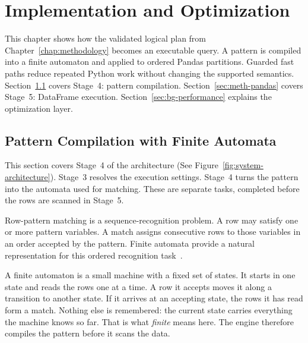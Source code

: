 \providecommand{\mr}{\texttt{MATCH\_RECOGNIZE}}
\chapter{Implementation and Optimization}
\label{chap:implementation}

This chapter shows how the validated logical plan from
Chapter~\ref{chap:methodology} becomes an executable query.  A pattern
is compiled into a finite automaton and applied to ordered
Pandas partitions.  Guarded fast paths reduce repeated Python
work without changing the supported semantics.
Section~\ref{sec:meth-automata} covers Stage~4: pattern compilation.
Section~\ref{sec:meth-pandas} covers Stage~5: DataFrame execution.
Section~\ref{sec:bg-performance} explains the optimization layer.

\section{Pattern Compilation with Finite Automata}
\label{sec:meth-automata}

This section covers Stage~4 of the architecture (See
Figure~\ref{fig:system-architecture}).  Stage~3 resolves the execution
settings.  Stage~4 turns the pattern into the automata used for
matching.  These are separate tasks, completed before the rows are
scanned in Stage~5.

Row-pattern matching is a sequence-recognition problem.  A row may
satisfy one or more pattern variables.  A match assigns consecutive
rows to those variables in an order accepted by the pattern.  Finite
automata provide a natural representation for this ordered
recognition task~\cite{HopcroftUllman}.

A finite automaton is a small machine with a fixed set of states.  It
starts in one state and reads the rows one at a time.  A row it accepts
moves it along a transition to another state.  If it arrives at an
accepting state, the rows it has read form a match.  Nothing else is
remembered: the current state carries everything the machine knows so
far.  That is what \emph{finite} means here.  The engine therefore
compiles the pattern before it scans the data.

